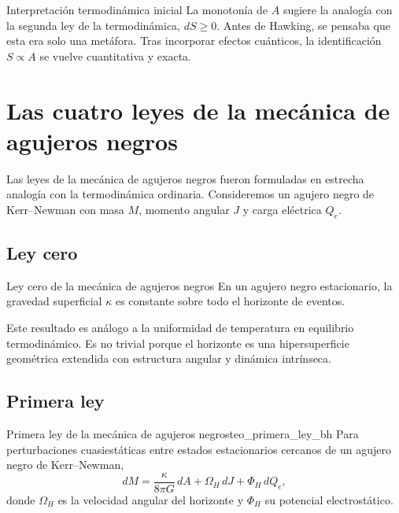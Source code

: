 \begin{observacion}{Interpretación termodinámica inicial}{}
La monotonía de $A$ sugiere la analogía con la segunda ley de la termodinámica, $dS\ge0$. Antes de Hawking, se pensaba que esta era solo una metáfora. Tras incorporar efectos cuánticos, la identificación $S\propto A$ se vuelve cuantitativa y exacta.
\end{observacion}

\section{Las cuatro leyes de la mecánica de agujeros negros}
\label{sec:cuatro_leyes_bh}

Las leyes de la mecánica de agujeros negros fueron formuladas en estrecha analogía con la termodinámica ordinaria. Consideremos un agujero negro de Kerr--Newman con masa $M$, momento angular $J$ y carga eléctrica $Q_e$.

\subsection{Ley cero}

\begin{proposicion}{Ley cero de la mecánica de agujeros negros}{}
En un agujero negro estacionario, la gravedad superficial $\kappa$ es constante sobre todo el horizonte de eventos.
\end{proposicion}

Este resultado es análogo a la uniformidad de temperatura en equilibrio termodinámico. Es no trivial porque el horizonte es una hipersuperficie geométrica extendida con estructura angular y dinámica intrínseca.

\subsection{Primera ley}

\begin{teorema}{Primera ley de la mecánica de agujeros negros}{teo_primera_ley_bh}
Para perturbaciones cuasiestáticas entre estados estacionarios cercanos de un agujero negro de Kerr--Newman,
\begin{equation}
  dM = \frac{\kappa}{8\pi G}\,dA + \Omega_H\,dJ + \Phi_H\,dQ_e,
  \label{eq:primera_ley_BH_cap9}
\end{equation}
donde $\Omega_H$ es la velocidad angular del horizonte y $\Phi_H$ su potencial electrostático.
\end{teorema}

